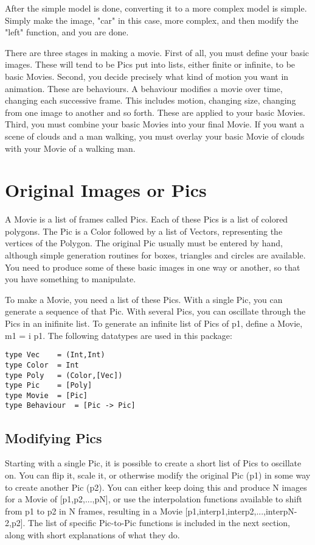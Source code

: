 	After the simple model is done, converting it to a more complex model
is simple. Simply make the image, "car" in this case, more complex, and
then modify the "left" function, and you are done.

	There are three stages in making a movie. First of all, you must
define your basic images. These will tend to be Pics put into lists, either
finite or infinite, to be basic Movies. Second, you decide precisely
what kind of motion you want in animation. These are behaviours. A behaviour
modifies a movie over time, changing each successive frame. This includes
motion, changing size, changing from one image to another and so forth. These 
are applied to your basic Movies. Third, you must combine your basic Movies
into your final Movie. If you want a scene of clouds and a man walking, you
must overlay your basic Movie of clouds with your Movie of a walking man.

\section {Original Images or Pics}

	A Movie is a list of frames called Pics. Each of these Pics is a list 
of colored polygons. The Pic is a Color followed by a list of Vectors, 
representing the vertices of the Polygon. The original Pic usually must
be entered by hand, although simple generation routines for boxes, 
triangles and circles are available. You need to produce some of these
basic images in one way or another, so that you have something to 
manipulate.

	To make a Movie, you need a list of these Pics. With a single Pic, you
can generate a sequence of that Pic. With several Pics, you can oscillate
through the Pics in an inifinite list. To generate an infinite list of
Pics of p1, define a Movie, m1 = i p1. 
  The following datatypes are used in this package:

\begin{verbatim}
type Vec	= (Int,Int)
type Color	= Int
type Poly	= (Color,[Vec])
type Pic 	= [Poly]
type Movie	= [Pic]
type Behaviour	= [Pic -> Pic]
\end{verbatim}


\subsection {Modifying Pics}

  Starting with a single Pic, it is possible to create a short list of
Pics to oscillate on. You can flip it, scale it, or otherwise modify the
original Pic (p1) in some way to create another Pic (p2). You can either
keep doing this and produce N images for a Movie of [p1,p2,...,pN], or use
the interpolation functions available to shift from p1 to p2 in N frames,
resulting in a Movie [p1,interp1,interp2,...,interpN-2,p2].
  The list of specific Pic-to-Pic functions is included in the next section,
along with short explanations of what they do.

